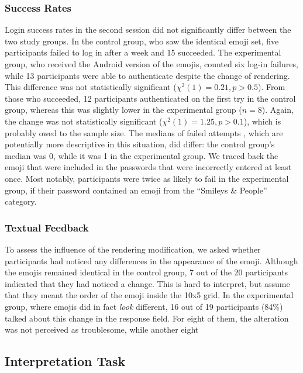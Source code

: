 \subsubsection{Success Rates}
Login success rates in the second session did not significantly differ between the two study groups. In the control group, who saw the identical emoji set, five participants failed to log in after a week and 15 succeeded. The experimental group, who received the Android version of the emojis, counted six log-in failures, while 13 participants were able to authenticate despite the change of rendering. This difference was not statistically significant ($\chi^2(1)=0.21, p>0.5$). From those who succeeded, 12 participants authenticated on the first try in the control group, whereas this was slightly lower in the experimental group ($n=8$). Again, the change was not statistically significant ($\chi^2(1)=1.25, p>0.1$), which is probably owed to the sample size. The medians of failed attempts , which are potentially more descriptive in this situation, did differ: the control group's median was 0, while it was 1 in the experimental group. We traced back the emoji that were included in the passwords that were incorrectly entered at least once. Most notably, participants were twice as likely to fail in the experimental group, if their password contained an emoji from the ``Smileys \& People'' category. 

\subsubsection{Textual Feedback}
To assess the influence of the rendering modification, we asked whether participants had noticed any differences in the appearance of the emoji. Although the emojis remained identical in the control group, 7 out of the 20 participants indicated that they had noticed a change. This is hard to interpret, but assume that they meant the order of the emoji inside the 10x5 grid. In the experimental group, where emojis did in fact \textit{look} different, 16 out of 19 participants (84\%) talked about this change in the response field. For eight of them, the alteration was not perceived as troublesome, while another eight 


\subsection{Interpretation Task}

